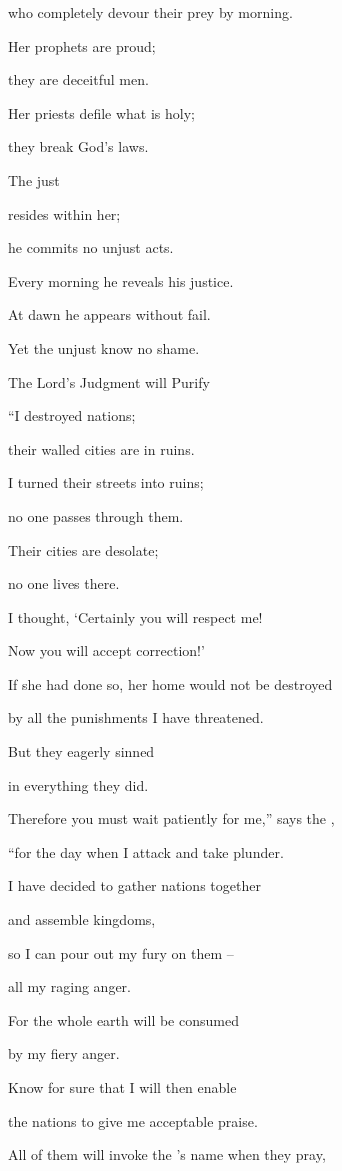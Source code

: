 {\par }{\Q who completely devour
their prey by morning.
\par }{\Q {}Her prophets
are proud;
\par }{\Q they are deceitful
men.
\par }{\Q Her priests
defile
what is holy;
\par }{\Q they break
God’s laws.
\par }{\Q {}The just

{}
resides within
her;
\par }{\Q he commits
no
unjust
acts.

\par }{\Q Every
morning
he reveals his justice.
\par }{\Q At dawn
he appears without
fail.
\par }{\Q Yet the unjust
know
no shame.
\par }{\SH The Lord’s Judgment will Purify
\par }{\Q {}“I destroyed
nations;
\par }{\Q their walled
cities
are in ruins.
\par }{\Q I turned their streets
into ruins;
\par }{\Q no one
passes
through them.
\par }{\Q Their cities
are desolate;
\par }{\Q no one lives there.
\par }{\Q {}I thought, ‘Certainly
you will respect
me!
\par }{\Q Now you will accept
correction!’

\par }{\Q If she had
done
so,
her home
would not
be destroyed

\par }{\Q by all
the punishments I have threatened.

\par }{\Q But
they eagerly sinned
\par }{\Q in everything they did.
\par }{\Q {}Therefore
you must wait
patiently for me,” says
the {},
\par }{\Q “for the day
when I attack
and take plunder.
\par }{\Q I have decided to gather
nations
together
\par }{\Q and assemble
kingdoms,
\par }{\Q so I can pour out
my fury
on them –
\par }{\Q all my raging anger.
\par }{\Q For the whole earth will be consumed
\par }{\Q by my fiery anger.
\par }{\Q {}Know for
sure that I will then
enable
\par }{\Q the nations
to give me acceptable
praise.
\par }{\Q All
of them will invoke
the
{}’s
name
when they pray,

}
